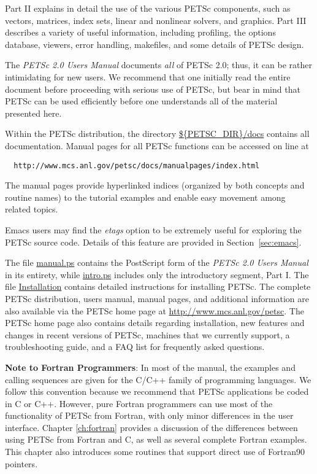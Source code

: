 Part II explains in detail the use of the various PETSc components,
such as vectors, matrices, index sets, linear and nonlinear
solvers, and graphics.  Part III describes a variety of useful
information, including profiling, the options database, viewers, error
handling, makefiles, and some details of
PETSc design.

\nocite{efficient}

The {\em PETSc 2.0 Users Manual} documents {\em all} of PETSc 2.0; thus,
it can be rather intimidating for new users. We recommend that one initially
read the entire document before proceeding with serious use of PETSc,
but bear in mind that PETSc can be used efficiently
before one understands all of the material presented here. 

\medskip \medskip

Within the PETSc distribution, the directory
\url{${PETSC_DIR}/docs} contains all documentation.
Manual pages for all PETSc functions can be
accessed on line at
\begin{verbatim}
  http://www.mcs.anl.gov/petsc/docs/manualpages/index.html
\end{verbatim}
The manual pages
provide hyperlinked indices (organized by
both concepts and routine names) to the tutorial examples and enable
easy movement among related topics.  

Emacs users may find the
{\em etags} option to be extremely useful for exploring the PETSc
source code.  Details of this feature are provided in
Section~\ref{sec:emacs}. 

The file \url{manual.ps} contains the PostScript form of
the {\em PETSc 2.0 Users Manual} in its entirety, while \url{intro.ps} 
includes only the introductory segment, Part I.   
The file \url{Installation} contains detailed instructions for
installing PETSc. The complete PETSc distribution, users
manual, manual pages, and additional information are also available via
the PETSc home page at
\url{http://www.mcs.anl.gov/petsc}.  The PETSc home page also
contains details regarding installation, new features and changes in recent
versions of PETSc, machines that we currently support, a
troubleshooting guide, and a FAQ list for frequently asked questions.

\medskip \medskip

{\bf Note to Fortran Programmers}: In most of the  
manual, the examples and calling sequences are given for the C/C++
family of programming languages.  We follow this convention because we
recommend that PETSc applications be coded in C or C++.
However, pure Fortran programmers can use most of the
functionality of PETSc from Fortran, with only minor differences in
the user interface.  Chapter \ref{ch:fortran} provides a discussion of the
differences between using PETSc from Fortran and C, as well as several
complete Fortran examples.  This chapter also introduces some
routines that support direct use of Fortran90 pointers.

